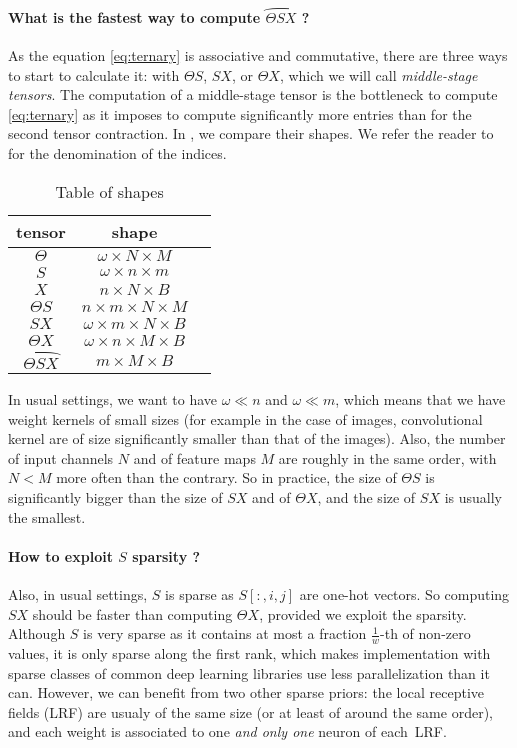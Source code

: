 \paragraph{What is the fastest way to compute $\wideparen{\Theta S X}$ ?}
As the equation \eqref{eq:ternary} is associative and commutative, there are three ways to start to calculate it: with $\Theta S$, $SX$, or $\Theta X$, which we will call \emph{middle-stage tensors}. The computation of a middle-stage tensor is the bottleneck to compute \eqref{eq:ternary} as it imposes to compute significantly more entries than for the second tensor contraction. In , we compare their shapes. We refer the reader to  for the denomination of the indices.

\begin{table}[H]
  \centering
\begin{tabular}{ccc}
  tensor & shape\\
  \hline
  $\Theta$ & $\omega \times N \times M$\\
  $S$ & $\omega \times n \times m$\\
  $X$ & $n \times N \times B$\\
  $\Theta S$ & $n \times m \times N \times M$\\
  $SX$ & $\omega \times m \times N \times B$\\
  $\Theta X$ & $\omega \times n \times M \times B$\\
  $\wideparen{\Theta SX}$ & $m \times M \times B$
\end{tabular}
\caption{Table of shapes}
\label{tab:mid}
\end{table}

In usual settings, we want to have $\omega \ll n$ and $\omega \ll m$, which means that we have weight kernels of small sizes (for example in the case of images, convolutional kernel are of size significantly smaller than that of the images). Also, the number of input channels $N$ and of feature maps $M$ are roughly in the same order, with $N < M$ more often than the contrary. So in practice, the size of $\Theta S$ is significantly bigger than the size of $SX$ and of $\Theta X$, and the size of $SX$ is usually the smallest.

\paragraph{How to exploit $S$ sparsity ?}
Also, in usual settings, $S$ is sparse as $S[:,i,j]$ are one-hot vectors. So computing $SX$ should be faster than computing $\Theta X$, provided we exploit the sparsity. Although $S$ is very sparse as it contains at most a fraction $\frac{1}{w}$-th of non-zero values, it is only sparse along the first rank, which makes implementation with sparse classes of common deep learning libraries use less parallelization than it can. However, we can benefit from two other sparse priors: the local receptive fields (LRF) are usualy of the same size (or at least of around the same order), and each weight is associated to one \emph{and only one} neuron of each~LRF.

